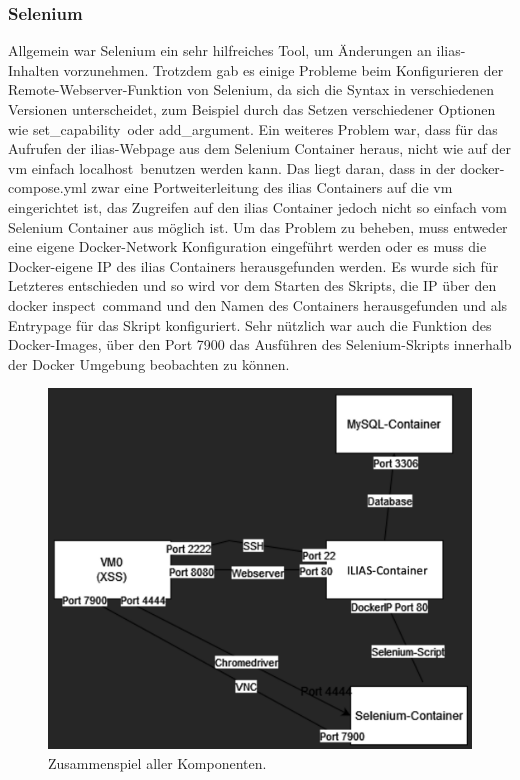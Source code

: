 \documentclass[10pt, a4paper,onecolumn ,titlepage]{article}
\begin{document}
    \subsubsection{Selenium}
    \label{subsubsec:lessonslearnedSelenium}
    Allgemein war Selenium ein sehr hilfreiches Tool, um Änderungen an \ac{ilias}-Inhalten vorzunehmen.
    Trotzdem gab es einige Probleme beim Konfigurieren der Remote-Webserver-Funktion von Selenium, da sich die Syntax in verschiedenen Versionen unterscheidet, zum Beispiel durch das Setzen verschiedener Optionen wie \glqq set\_capability\grqq\ oder \glqq add\_argument\grqq.
    Ein weiteres Problem war, dass für das Aufrufen der \ac{ilias}-Webpage aus dem Selenium Container heraus, nicht wie auf der \ac{vm} einfach \glqq localhost\grqq\ benutzen werden kann.
    Das liegt daran, dass in der docker-compose.yml zwar eine Portweiterleitung des \ac{ilias} Containers auf die \ac{vm} eingerichtet ist, das Zugreifen auf den \ac{ilias} Container jedoch nicht so einfach vom Selenium Container aus möglich ist.
    Um das Problem zu beheben, muss entweder eine eigene Docker-Network Konfiguration eingeführt werden oder es muss die Docker-eigene IP des \ac{ilias} Containers herausgefunden werden.
    Es wurde sich für Letzteres entschieden und so wird vor dem Starten des Skripts, die IP über den \glqq docker inspect\grqq\ command und den Namen des Containers herausgefunden und als Entrypage für das Skript konfiguriert.
    \noindent
    Sehr nützlich war auch die Funktion des Docker-Images, über den Port 7900 das Ausführen des Selenium-Skripts innerhalb der Docker Umgebung beobachten zu können.

    \begin{figure}[H]
        \centering
        \includegraphics[width=1\textwidth]{other_pictures/selenium}
        \caption{Zusammenspiel aller Komponenten.}
        \label{fig:seleniumPicture}
    \end{figure}
\end{document}
